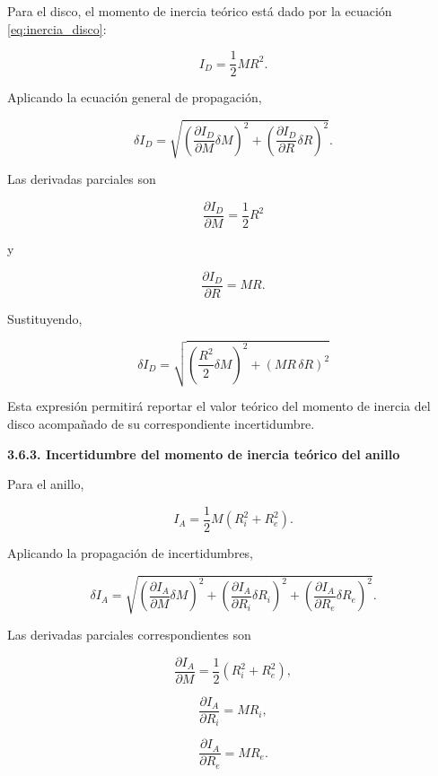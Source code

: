 \documentclass[11pt,a4paper]{article}
\begin{document}
\begin{list}{}{\leftmargin=1.2cm\rightmargin=0cm}
\vspace{0.3em}

Para el disco, el momento de inercia teórico está dado por la ecuación
\eqref{eq:inercia_disco}:

\[
I_D=\frac{1}{2}MR^2.
\]

Aplicando la ecuación general de propagación,

\[
\delta I_D=
\sqrt{
\left(
\frac{\partial I_D}{\partial M}\delta M
\right)^2+
\left(
\frac{\partial I_D}{\partial R}\delta R
\right)^2
}.
\]

Las derivadas parciales son

\[
\frac{\partial I_D}{\partial M}
=
\frac{1}{2}R^2
\]

y

\[
\frac{\partial I_D}{\partial R}
=
MR.
\]

Sustituyendo,

\begin{equation}
\delta I_D=
\sqrt{
\left(
\frac{R^2}{2}\delta M
\right)^2+
\left(
MR\,\delta R
\right)^2
}
\label{eq:incertidumbre_disco}
\end{equation}

Esta expresión permitirá reportar el valor teórico del momento de inercia
del disco acompañado de su correspondiente incertidumbre.



\textbf{3.6.3. Incertidumbre del momento de inercia teórico del anillo}

\vspace{0.3em}

Para el anillo,

\[
I_A=
\frac{1}{2}M(R_i^2+R_e^2).
\]

Aplicando la propagación de incertidumbres,

\[
\delta I_A=
\sqrt{
\left(
\frac{\partial I_A}{\partial M}\delta M
\right)^2+
\left(
\frac{\partial I_A}{\partial R_i}\delta R_i
\right)^2+
\left(
\frac{\partial I_A}{\partial R_e}\delta R_e
\right)^2
}.
\]

Las derivadas parciales correspondientes son

\[
\frac{\partial I_A}{\partial M}
=
\frac{1}{2}(R_i^2+R_e^2),
\]

\[
\frac{\partial I_A}{\partial R_i}
=
MR_i,
\]

\[
\frac{\partial I_A}{\partial R_e}
=
MR_e.
\]


\end{list}
\end{document}

